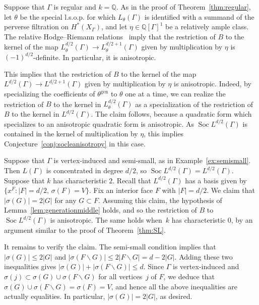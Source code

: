 \begin{example}
Suppose that $\Gamma$ is regular and $k = \mathbb{Q}$. As in the proof of Theorem~\ref{thm:regular}, let $\theta$ be the special l.s.o.p. for which $L_{\theta}(\Gamma)$ is identified with a summand of the perverse filtration on $H^*(X_{\Gamma})$, and let $\eta \in \mathbb{Q}[\Gamma]^1$ be a relatively ample class. The relative Hodge--Riemann relations~\cite[Theorem 3.3.1(7)]{dCM} imply that the restriction of $B$ to the kernel of the map $L^{d/2}_{\theta}(\Gamma) \to L^{d/2 +1}_{\theta}(\Gamma)$ given by multiplication by $\eta$ is $(-1)^{d/2}$-definite. In particular, it is anisotropic. 

This implies that the restriction of $B$ to the kernel of the map $L^{d/2}(\Gamma) \to L^{d/2 +1}(\Gamma)$ given by multiplication by $\eta$ is anisotropic. Indeed, by specializing the coefficients of $\theta^{\operatorname{gen}}$ to $\theta$ one at a time, we can realize the restriction of $B$ to the kernel in $L^{d/2}_{\theta}(\Gamma)$ as a specialization of the restriction of $B$ to the kernel in $L^{d/2}(\Gamma)$. The claim follows, because a quadratic form which specializes to an anisotropic quadratic form is anisotropic. As $\operatorname{Soc} L^{d/2}(\Gamma)$ is contained in the kernel of multiplication by $\eta$, this implies Conjecture~\ref{conj:socleanisotropy} in this case. 
\end{example}


\begin{example}
Suppose that $\Gamma$ is vertex-induced and semi-small, as in Example~\ref{ex:semismall}. Then $L(\Gamma)$ is concentrated in degree $d/2$, so $\operatorname{Soc} L^{d/2}(\Gamma) = L^{d/2}(\Gamma)$. Suppose that $k$ has characteristic $2$. 
Recall that  $L^{d/2}(\Gamma)$ has a basis given by \mbox{$\{x^F : |F| = d/2, \, \sigma(F) = V\}$}. Fix an interior face $F$ with  $|F| = d/2$. 
We claim that $|\sigma(G)| = 2 |G|$ for any $G \subset F$. Assuming this claim, the hypothesis of Lemma~\ref{lem:generationmiddle} holds, and so the restriction of $B$ to $\operatorname{Soc} L^{d/2}(\Gamma)$ is anisotropic. The same holds when~$k$ has characteristic $0$, by an argument similar to the proof of Theorem~\ref{thm:SL}. 

It remains to verify the claim. 
The semi-small condition implies that \mbox{$|\sigma(G)| \le 2 |G|$} and $|\sigma(F \smallsetminus G)| \le 2 |F \smallsetminus G| = d - 2|G|$.
Adding these two inequalities gives $|\sigma(G)| + |\sigma(F \smallsetminus G)| \le d$. 
Since $\Gamma$ is vertex-induced and $\sigma(j) \subset \sigma(G) \cup \sigma(F \smallsetminus G)$ for all vertices~$j$ of $F$, we deduce that 
$\sigma(G) \cup \sigma(F \smallsetminus G) = \sigma(F) = V$, and hence all the above inequalities are actually equalities. In particular, $|\sigma(G)| = 2 |G|$, as desired.

\end{example}
